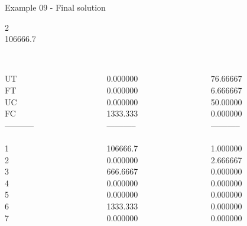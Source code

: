 \begin{frame}{Example 09 - Final solution}

 2 \\
  106666.7\\

\begin{columns}[t]
\begin{column}{0.3\textwidth}
\\
UT\\
FT\\
UC\\
FC\\
-----------\\
\\
1\\
2\\
3\\
4\\
5\\
6\\
7\\

\end{column}
\begin{column}{0.3\textwidth}
\\
0.000000\\
0.000000\\
0.000000\\
1333.333\\

-----------\\
\\
106666.7\\
0.000000\\
666.6667\\
0.000000\\
0.000000\\
1333.333\\
0.000000\\

\end{column}  

\begin{column}{0.3\textwidth}
\\
76.66667\\
6.666667\\
50.00000\\
0.000000\\


-----------\\
\\
1.000000\\
2.666667\\
0.000000\\
0.000000\\
0.000000\\
0.000000\\
0.000000\\

\end{column}
\end{columns}  
\end{frame}
